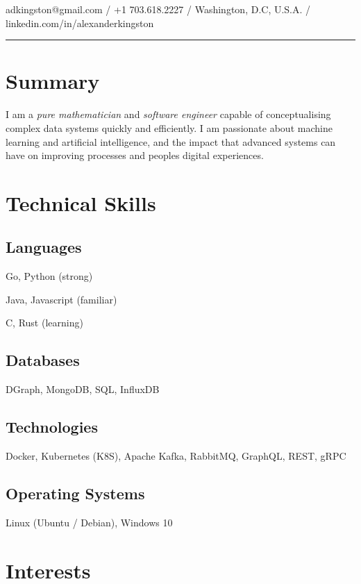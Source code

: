 \documentclass{adk_cv}
\begin{document}
\color{default}
\noindent {}

\noindent adkingston@gmail.com \hfill / \hfill +1 703.618.2227 \hfill / \hfill Washington, D.C, U.S.A. \hfill / \hfill linkedin.com/in/alexanderkingston
\noindent\rule{\textwidth}{1pt}

\begingroup\hspace{-20pt}\endgroup
\begin{minipage}[t]{\dimexpr.36\linewidth}
    \begin{flushleft}
    \section{Summary}
    I am a \textit{pure mathematician} and \textit{software engineer} capable of conceptualising complex data systems quickly and efficiently.
    I am passionate about machine learning and artificial intelligence, and the impact that advanced systems can have on improving processes and peoples digital experiences.

\section{Technical Skills}
\subsection{Languages}
Go, Python (strong)

Java, Javascript (familiar)

C, Rust (learning)

\subsection{Databases}
DGraph, MongoDB, SQL, InfluxDB


\subsection{Technologies}
Docker, Kubernetes (K8S), Apache Kafka, RabbitMQ, GraphQL, REST, gRPC


\subsection{Operating Systems}
Linux (Ubuntu / Debian), Windows 10

\section{Interests}

\end{flushleft}
\end{minipage}
\end{document}
